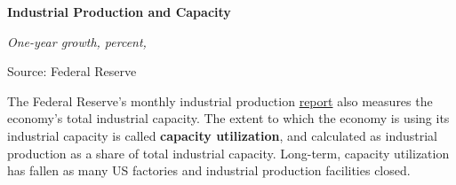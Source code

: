 \documentclass{report}
\newcommand{\tbllink}[1]{\href{https://raw.githubusercontent.com/bdecon/US-chartbook/master/chartbook/data/#1}{\faTable}}
\newcommand{\barylab}[2]{yticklabel style={text width=#1, align=right, 
		style={black!70}, text height=#2},}
\newcommand{\bbar}[2]{extra #1 ticks = {{#2}}, extra #1 tick labels = ,
		extra #1 tick style = {grid=major, grid style={thick, black!25}},}
\newcommand{\barplotnogrid}{xbar=0pt, axis line style={draw=none},
	    yticklabel style={align=left, anchor=east},
      		xmajorticks=false, ymajorgrids=false,   
	    ytick=data, tickwidth=0pt, area legend, reverse legend,
	    nodes near coords, nodes near coords align={horizontal},}
\begin{document}
{{{{\begin{minipage}{0.76\textwidth}
\end{minipage}
\newpage
\begin{minipage}{0.31\textwidth}
\small 

\end{minipage} \hspace{5mm}
\begin{minipage}{0.4\textwidth}
\normalsize \textbf{Industrial Production and Capacity}

\footnotesize{\textit{One-year growth, percent, }}

\hspace*{-5mm} 

\footnotesize{Source: Federal Reserve} \hfill \tbllink{ip_comp.csv}

\end{minipage}

\vspace{2mm}

\begin{minipage}{0.76\textwidth}
\small The Federal Reserve's monthly industrial production \href{https://www.federalreserve.gov/releases/g17/}{report} also measures the economy's total industrial capacity. The extent to which the economy is using its industrial capacity is called \textbf{capacity utilization}, and calculated as industrial production as a share of total industrial capacity. Long-term, capacity utilization has fallen as many US factories and industrial production facilities closed. 

\vspace{4mm}


\end{minipage}}}}}
\end{document}
